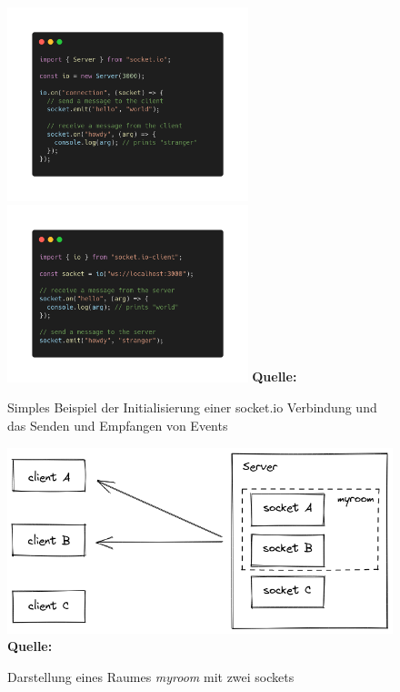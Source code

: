 \documentclass[a4paper,12pt]{report}
\begin{document}
  \begin{figure}[ht]
\raggedleft
  \includegraphics[width=70mm]{socket.io-server-beispiel.png}
  \includegraphics[width=70mm]{socket.io-client-beispiel.png}
    \footnotesize\sffamily\textbf{Quelle:} \cite{socketio}
  \caption{Simples Beispiel der Initialisierung einer socket.io Verbindung und das Senden und Empfangen von Events}
  \label{fig:socket.io-beispiel}
\end{figure}

  \begin{figure}[ht]
\raggedleft
  \includegraphics[width=160mm]{socket.io-rooms.png}
    \footnotesize\sffamily\textbf{Quelle:} \cite{socket-rooms}
  \caption{Darstellung eines Raumes \textit{myroom} mit zwei sockets}
  \label{fig:socket.io-room}
\end{figure}
\end{document}
